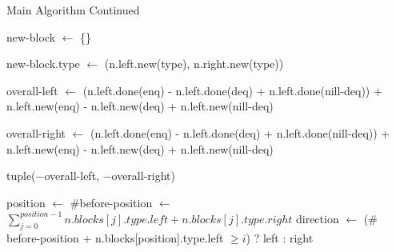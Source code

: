 \documentclass[10pt,table]{article}
\theoremstyle{definition}
\begin{document}
\begin{algorithm}
\caption{Main Algorithm Continued}\label{alg}
\begin{algorithmic}[1]
\onehalfspacing




\State new-block $\leftarrow$  \{\}



%
%

\State new-block.type $\leftarrow$ \big(n.left.new(type), n.right.new(type)\big)
\EndFor 

\State overall-left $\leftarrow$ \big(n.left.done(enq) - n.left.done(deq) + n.left.done(nill-deq)\big) + n.left.new(enq) - n.left.new(deq) + n.left.new(nill-deq)

\State overall-right $\leftarrow$ \big(n.left.done(enq) - n.left.done(deq) + n.left.done(nill-deq)\big) + n.left.new(enq) - n.left.new(deq) + n.left.new(nill-deq)

\State \Return tuple\big($-$overall-left, $-$overall-right\big)

\EndFunction


\Statex


\State position $\leftarrow$ 
\State $\#$before-position $\leftarrow$ $\sum_{j=0}^{position-1} n.blocks[j].type.left + n.blocks[j].type.right$
\State direction $\leftarrow$ \big($\#$before-position + n.blocks[position].type.left $\geq i$\big) ? left : right


\end{algorithmic}
\end{algorithm}
\end{document}
